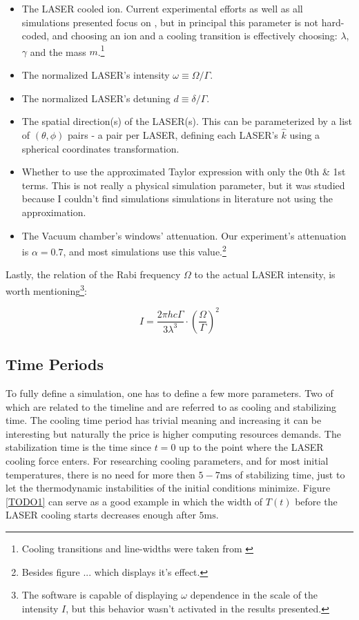 \begin{itemize}
	\item The LASER cooled ion. Current experimental efforts as well as all simulations presented focus on , but in principal this parameter is not hard-coded, and choosing an ion and a cooling transition is effectively choosing: $\lambda$, $\gamma$ and the mass $m$.\footnote{Cooling transitions and line-widths were taken from \cite{CoolingBeParameters,CoolingCaParameters1,CoolingCaParameters2,RansfordThesis,RadiumData}}
	\item The normalized LASER's intensity $\omega \equiv \Omega/\Gamma$.
	\item The normalized LASER's detuning $d \equiv \delta/\Gamma$.
	\item The spatial direction(s) of the LASER(s). This can be parameterized by a list of $(\theta, \phi)$ pairs - a pair per LASER, defining each LASER's $\hat{k}$ using a spherical coordinates transformation.
	\item Whether to use the approximated Taylor expression with only the 0th \& 1st terms. This is not really a physical simulation parameter, but it was studied because I couldn't find simulations simulations in literature not using the approximation.
	\item The Vacuum chamber's windows' attenuation. Our experiment's attenuation is $\alpha = 0.7$, and most simulations use this value.\footnote{Besides figure ... which displays it's effect.}
\end{itemize}

Lastly, the relation of the Rabi frequency $\Omega$ to the actual LASER intensity\cite{CJFootOmega2I}, is worth mentioning\footnote{The software is capable of displaying $\omega$ dependence in the scale of the intensity $I$, but this behavior wasn't activated in the results presented.}:

\begin{equation}
	I = \frac{2\pi h c \Gamma}{3 \lambda^3} \cdot \left(\frac{\Omega}{\Gamma}\right)^2
\end{equation}

\subsection{Time Periods}

To fully define a simulation, one has to define a few more parameters. Two of which are related to the timeline and are referred to as cooling and stabilizing time. The cooling time period has trivial meaning and increasing it can be interesting but naturally the price is higher computing resources demands. The stabilization time is the time since $t=0$ up to the point where the LASER cooling force enters. For researching cooling parameters, and for most initial temperatures, there is no need for more then $5-7\mathrm{ms}$ of stabilizing time, just to let the thermodynamic instabilities of the initial conditions minimize. Figure \ref{TODO1} can serve as a good example in which the width of $T(t)$ before the LASER cooling starts decreases enough after $5 \mathrm{ms}$.

